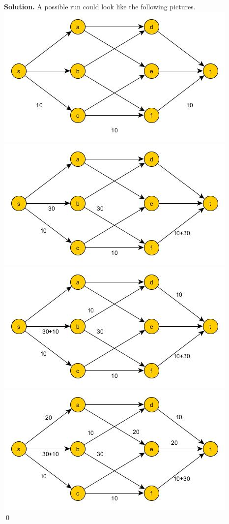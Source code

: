\documentclass[a4paper,11pt]{amsart}
\newenvironment{solution}{\textbf{Solution.}}{\qed}
\begin{document}
\begin{solution}
	A possible run could look like the following pictures.\\
	\includegraphics{A6_1.jpg} \\
	\includegraphics{A6_2.jpg} \\
	\includegraphics{A6_3.jpg} \\
	\includegraphics{A6_4.jpg} \\

\end{solution}
\end{document}
